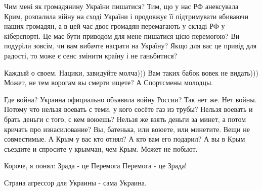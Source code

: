 \begin{cmtfront}

Чим мені як громадянину України пишатися? Тим, що у нас РФ анексувала Крим,
розпалила війну на сході України і продовжує її підтримувати вбиваючи наших
громадян, а в цей час двоє громадян перемагають у складі РФ у кіберспорті. Це
має бути приводом для мене пишатися цією перемогою? Ви подуріли зовсім, чи вам
вибачте насрати на Україну? Якщо для вас це привід для радості, то може є сенс
змінити країну і не ганьбитися?


Каждый о своем. Нацики, завидуйте молча))) Вам таких бабок вовек не видать)))
Может, не тем ворогам вы смерти ищете? А Спортсмены молодцы.


Где война? Украина официально объявила войну России? Так нет же. Нет войны.
Потому что нельзя воевать с теми, у кого сосёте газ из трубы? Нельзя воевать и
брать деньги с того, с кем воюешь? Нельзя же взять деньги за минет, а потом
кричать про изнасилование? Вы, батенька, или воюете, или минетите. Вещи не
совместимые. А Крым у вас кто отнял? А кто вам его подарил? А вы в Крым
съездите и спросите у крымчан, чем Крым. Может не побьют.


Короче, я понял: Зрада - це Перемога Перемога - це Зрада!


Страна агрессор для Украины - сама Украина.
	
\end{cmtfront}

